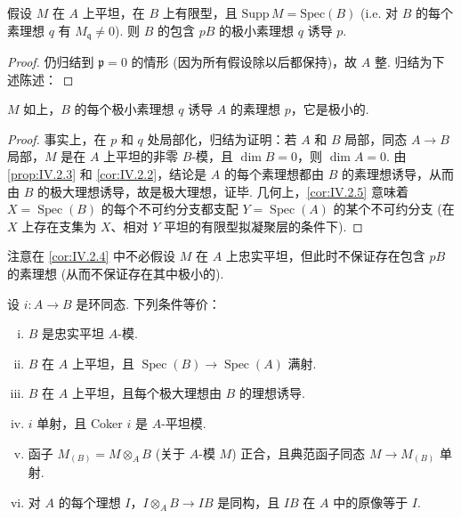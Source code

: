 \begin{corollary}\label{cor:IV.2.4}
假设 $M$ 在 $A$ 上平坦，在 $B$ 上有限型，且 $\mathrm{Supp}\, M = \mathrm{Spec}(B)$ (i.e. 对 $B$ 的每个素理想 $q$ 有 $M_{\mathfrak{q}} \neq 0$). 则 $B$ 的包含 $pB$ 的极小素理想 $q$ 诱导 $p$.
\end{corollary}

\begin{proof}
仍归结到 $\mathfrak{p} = 0$ 的情形 (因为所有假设除以后都保持)，故 $A$ 整. 归结为下述陈述：
\end{proof}

\begin{corollary}\label{cor:IV.2.5}
$M$ 如上，$B$ 的每个极小素理想 $q$ 诱导 $A$ 的素理想 $p$，它是极小的.
\end{corollary}

\begin{proof}
事实上，在 $p$ 和 $q$ 处局部化，归结为证明：若 $A$ 和 $B$ 局部，同态 $A \to B$ 局部，$M$ 是在 $A$ 上平坦的非零 $B$-模，且 $\dim B = 0$，则 $\dim A = 0$. 由 \ref{prop:IV.2.3} 和 \ref{cor:IV.2.2}，结论是 $A$ 的每个素理想都由 $B$ 的素理想诱导，从而由 $B$ 的极大理想诱导，故是极大理想，证毕. 几何上，\ref{cor:IV.2.5} 意味着 $X = \operatorname{Spec}(B)$ 的每个不可约分支都支配 $Y = \operatorname{Spec}(A)$ 的某个不可约分支 (在 $X$ 上存在支集为 $X$、相对 $Y$ 平坦的有限型拟凝聚层的条件下).
\end{proof}

注意在 \ref{cor:IV.2.4} 中不必假设 $M$ 在 $A$ 上忠实平坦，但此时不保证存在包含 $pB$ 的素理想 (从而不保证存在其中极小的).

\begin{proposition}\label{prop:IV.2.6}
设 $i \colon A \to B$ 是环同态. 下列条件等价：
\begin{enumerate}[(i)]
\item $B$ 是忠实平坦 $A$-模.
\item $B$ 在 $A$ 上平坦，且 $\operatorname{Spec}(B) \to \operatorname{Spec}(A)$ 满射.
\item[(ii bis)] $B$ 在 $A$ 上平坦，且每个极大理想由 $B$ 的理想诱导.
\item $i$ 单射，且 Coker $i$ 是 $A$-平坦模.
\item 函子 $M_{(B)} = M \otimes_A B$ (关于 $A$-模 $M$) 正合，且典范函子同态 $M \to M_{(B)}$ 单射.
\item[(iv bis)] 对 $A$ 的每个理想 $I$，$I \otimes_A B \to IB$ 是同构，且 $IB$ 在 $A$ 中的原像等于 $I$.
\end{enumerate}
\end{proposition}

